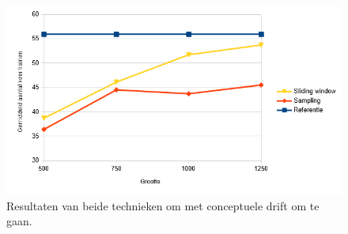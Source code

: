 \begin{figure}[th]
	\includegraphics[width=\linewidth]{images/evaluatie/conceptuele_drift_vergelijking.png}
	\caption{Resultaten van beide technieken om met conceptuele drift om te gaan.}
	\label{fig:conceptuele drift vergelijking}
\end{figure}

